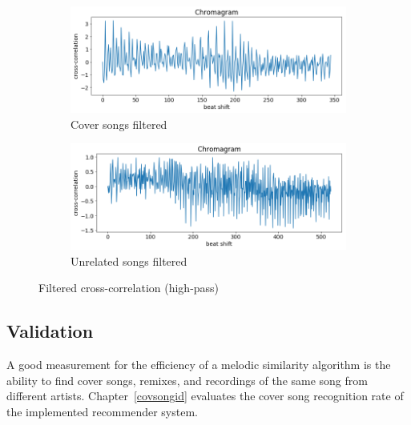 \begin{figure}[htbp]
{{%
			\begin{subfigure}{.495\textwidth}
				\centering    
				\includegraphics[scale=0.3]{Images/Chroma/beatalignedchroma_corr_mean_filt.png}
				\caption{Cover songs filtered}
				\label{ccf3}
			\end{subfigure}		
			\begin{subfigure}{.495\textwidth}
				\centering     
				\includegraphics[scale=0.3]{Images/Chroma/beatalignedchroma_corr_mean2_filt.png}
				\caption{Unrelated songs filtered}
				\label{ccf4}
			\end{subfigure}%
	}}
	\caption{Filtered cross-correlation (high-pass)}
	\label{fig:crosscorr3}
\end{figure}
\FloatBarrier

\subsection{Validation}\label{chromavalid}
A good measurement for the efficiency of a melodic similarity algorithm is the ability to find cover songs, remixes, and recordings of the same song from different artists. Chapter~\ref{covsongid} evaluates the cover song recognition rate of the implemented recommender system. 
